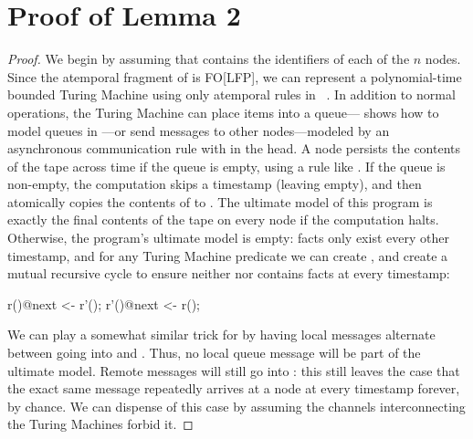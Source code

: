\section{Proof of Lemma 2}
\begin{proof}
We begin by assuming that  contains the identifiers of each of the $n$ nodes.  Since the atemporal fragment of \lang is FO[LFP], we can represent a polynomial-time bounded Turing Machine using only atemporal rules in \lang~\cite{immerman-ptime}.  In addition to normal operations, the Turing Machine can place items into a queue---\cite{dedalus} shows how to model queues in \lang---or send messages to other nodes---modeled by an asynchronous communication rule with  in the head.  A node persists the contents of the tape across time if the queue is empty, using a rule like .  If the queue is non-empty, the computation skips a timestamp (leaving  empty), and then atomically copies the contents of  to .  The ultimate model of this program is exactly the final contents of the tape on every node if the computation halts.  Otherwise, the program's ultimate model is empty:  facts only exist every other timestamp, and for any Turing Machine predicate  we can create , and create a mutual recursive cycle to ensure neither  nor  contains facts at every timestamp:

\begin{Dedalus}
r()@next <- r'();
r'()@next <- r();
\end{Dedalus}

We can play a somewhat similar trick for  by having local messages alternate between going into  and .  Thus, no local queue message will be part of the ultimate model.  Remote messages will still go into : this still leaves the case that the exact same message repeatedly arrives at a node at every timestamp forever, by chance.  We can dispense of this case by assuming the channels interconnecting the Turing Machines forbid it.
\end{proof}

